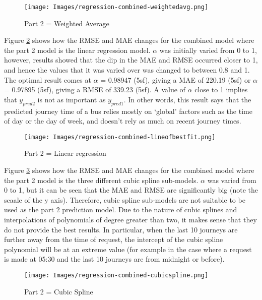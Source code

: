 \begin{figure}[H]
\begin{center}
    \texttt{[image: Images/regression-combined-weightedavg.png]}
    \caption{Part 2 = Weighted Average}
    \label{fig:regression-part2weightedavg}
\end{center}
\end{figure}

Figure \ref{fig:regression-part2lineofbestfit} shows how the RMSE and MAE changes for the combined model where the part 2 model is the linear regression model. $\alpha$ was initially varied from 0 to 1, however, results showed that the dip in the MAE and RMSE occurred closer to 1, and hence the values that it was varied over was changed to between 0.8 and 1. The optimal result comes at $\alpha$ = 0.98947 (5sf), giving a MAE of 220.19 (5sf) or $\alpha$ = 0.97895 (5sf), giving a RMSE of 339.23 (5sf). A value of $\alpha$ close to 1 implies that $y_{pred2}$ is not as important as $y_{pred1}$. In other words, this result says that the predicted journey time of a bus relies mostly on `global' factors such as the time of day or the day of week, and doesn't rely as much on recent journey times.

\begin{figure}[H]
\begin{center}
    \texttt{[image: Images/regression-combined-lineofbestfit.png]}
    \caption{Part 2 = Linear regression}
    \label{fig:regression-part2lineofbestfit}
\end{center}
\end{figure}

Figure \ref{fig:regression-part2cubicspline} shows how the RMSE and MAE changes for the combined model where the part 2 model is the three different cubic spline sub-models. $\alpha$ was varied from 0 to 1, but it can be seen that the MAE and RMSE are significantly big (note the scaale of the y axis). Therefore, cubic spline sub-models are not suitable to be used as the part 2 prediction model. Due to the nature of cubic splines and interpolations of polynomials of degree greater than two, it makes sense that they do not provide the best results. In particular, when the last 10 journeys are further away from the time of request, the intercept of the cubic spline polynomial will be at an extreme value (for example in the case where a request is made at 05:30 and the last 10 journeys are from midnight or before).

\begin{figure}[H]
\begin{center}
    \texttt{[image: Images/regression-combined-cubicspline.png]}
    \caption{Part 2 = Cubic Spline}
    \label{fig:regression-part2cubicspline}
\end{center}
\end{figure}

